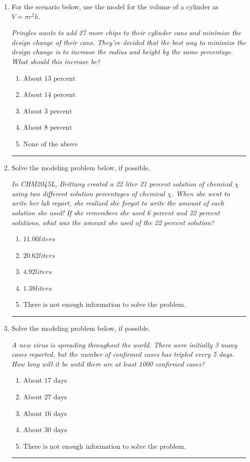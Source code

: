 \documentclass[14pt]{extbook}
\newcommand{\litem}[1]{\item#1\hspace*{-1cm}\rule{\textwidth}{0.4pt}}
\begin{document}
\begin{enumerate}
{\begin{enumerate}[label=\Alph*.]
\end{enumerate} }
\litem{
For the scenario below, use the model for the volume of a cylinder as $V = \pi r^2 h$.
\begin{center}
    \textit{ Pringles wants to add 27 \text{percent} more chips to their cylinder cans and minimize the design change of their cans. They've decided that the best way to minimize the design change is to increase the radius and height by the same percentage. What should this increase be? }
\end{center}
\begin{enumerate}[label=\Alph*.]
\item \( \text{About } 13 \text{ percent} \)
\item \( \text{About } 14 \text{ percent} \)
\item \( \text{About } 3 \text{ percent} \)
\item \( \text{About } 8 \text{ percent} \)
\item \( \text{None of the above} \)

\end{enumerate} }
\litem{
Solve the modeling problem below, if possible.
\begin{center}
    \textit{ In CHM2045L, Brittany created a 22 liter 21 percent solution of chemical $\chi$ using two different solution percentages of chemical $\chi$. When she went to write her lab report, she realized she forgot to write the amount of each solution she used! If she remembers she used 6 percent and 22 percent solutions, what was the amount she used of the 22 percent solution? }
\end{center}
\begin{enumerate}[label=\Alph*.]
\item \( 11.00 liters \)
\item \( 20.62 liters \)
\item \( 4.92 liters \)
\item \( 1.38 liters \)
\item \( \text{There is not enough information to solve the problem.} \)

\end{enumerate} }
\litem{
Solve the modeling problem below, if possible.
\begin{center}
    \textit{ A new virus is spreading throughout the world. There were initially 3 many cases reported, but the number of confirmed cases has tripled every 5 days. How long will it be until there are at least 1000 confirmed cases? }
\end{center}
\begin{enumerate}[label=\Alph*.]
\item \( \text{About } 17 \text{ days} \)
\item \( \text{About } 27 \text{ days} \)
\item \( \text{About } 16 \text{ days} \)
\item \( \text{About } 30 \text{ days} \)
\item \( \text{There is not enough information to solve the problem.} \)


\end{enumerate}}
\end{enumerate}
\end{document}

